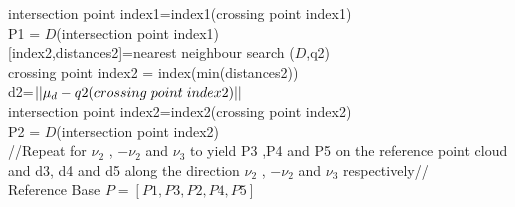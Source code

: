 \documentclass[12pt]{article}
\begin{document}
\begin{algorithm}[H]
intersection point index1=index1(crossing point index1)\\
P1 = $D$(intersection point index1)\\
\vspace{0.25cm}
[index2,distances2]=nearest neighbour search ($D$,q2)\\
crossing point index2 = index(min(distances2))\\
d2=$||\mu_d-q2(crossing\hspace{0.1cm} point\hspace{0.1cm} index2)||$\\
intersection point index2=index2(crossing point index2)\\
P2 = $D$(intersection point index2)\\
\vspace{0.25cm}
//Repeat for $\nu_2$ , $-\nu_2$ and $\nu_3$ to yield P3 ,P4 and P5 on the reference point cloud and d3, d4 and d5 along the direction $\nu_2$ , $-\nu_2$ and $\nu_3$ respectively// \\
\vspace{0.25cm}
Reference Base $P = [P1, P3, P2, P4, P5]$\\
\end{algorithm}
\newpage
\end{document}
